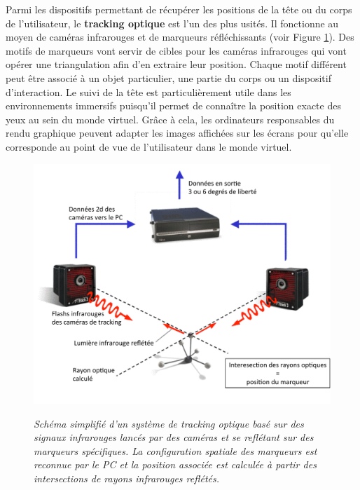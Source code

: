 Parmi les dispositifs permettant de récupérer les positions de la tête ou du corps de l'utilisateur, le \textbf{tracking optique} est l'un des plus usités. Il fonctionne au moyen de caméras infrarouges et de marqueurs réfléchissants (voir Figure \ref{Fig:ir-tracking}). Des motifs de marqueurs vont servir de cibles pour les caméras infrarouges qui vont opérer une triangulation afin d'en extraire leur position. Chaque motif différent peut être associé à un objet particulier, une partie du corps ou un dispositif d'interaction. Le suivi de la tête est particulièrement utile dans les environnements immersifs puisqu'il permet de connaître la position exacte des yeux au sein du monde virtuel. Grâce à cela, les ordinateurs responsables du rendu graphique peuvent adapter les images affichées sur les écrans pour qu'elle corresponde au point de vue de l'utilisateur dans le monde virtuel.

\begin{figure}
  \centering
  {\includegraphics[width=.65\linewidth]{./figures/ch2/IR-tracking}}
    \caption{{\it Schéma simplifié d'un système de tracking optique basé sur des signaux infrarouges lancés par des caméras et se reflétant sur des marqueurs spécifiques. La configuration spatiale des marqueurs est reconnue par le PC et la position associée est calculée à partir des intersections de rayons infrarouges reflétés.}}
  \label{Fig:ir-tracking}
  \hspace{0.3cm}
\end{figure}

